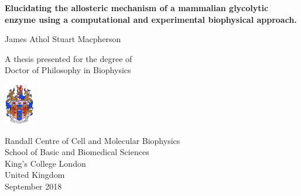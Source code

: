\begin{titlepage}
    \begin{center}
        \vspace*{1cm}
        
        \Huge
	\textbf{Elucidating the allosteric mechanism of a mammalian glycolytic enzyme using a computational and experimental biophysical approach.}
        
	\LARGE        
        \vspace{1.5cm}
        
        James Athol Stuart Macpherson
        
        \vfill
        
        A thesis presented for the degree of\\
        Doctor of Philosophy in Biophysics
        
        \vspace{0.8cm}
        
        \includegraphics[width=0.1\textwidth]{King_College_London_crest.png}
        
        Randall Centre of Cell and Molecular Biophysics\\
	School of Basic and Biomedical Sciences\\
        King's College London\\
        United Kingdom\\
        September 2018
        
    \end{center}
\end{titlepage}

